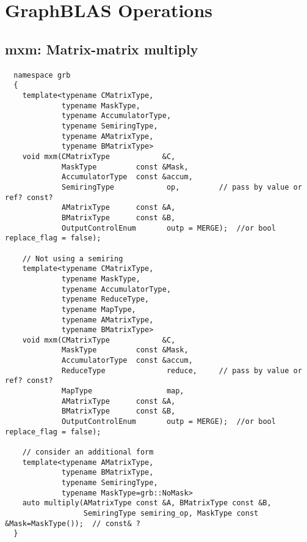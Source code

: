 \pagebreak
\section{GraphBLAS Operations}

\subsection{{\sf mxm}: Matrix-matrix multiply}

\paragraph{\syntax}

\begin{verbatim}
  namespace grb 
  {
    template<typename CMatrixType,
             typename MaskType,
             typename AccumulatorType,
             typename SemiringType,
             typename AMatrixType,
             typename BMatrixType>
    void mxm(CMatrixType            &C,
             MaskType         const &Mask,
             AccumulatorType  const &accum,
             SemiringType            op,         // pass by value or ref? const?
             AMatrixType      const &A,
             BMatrixType      const &B,
             OutputControlEnum       outp = MERGE);  //or bool replace_flag = false);

    // Not using a semiring
    template<typename CMatrixType,
             typename MaskType,
             typename AccumulatorType,
             typename ReduceType,
             typename MapType,
             typename AMatrixType,
             typename BMatrixType>
    void mxm(CMatrixType            &C,
             MaskType         const &Mask,
             AccumulatorType  const &accum,
             ReduceType              reduce,     // pass by value or ref? const?
             MapType                 map,
             AMatrixType      const &A,
             BMatrixType      const &B,
             OutputControlEnum       outp = MERGE);  //or bool replace_flag = false);

    // consider an additional form
    template<typename AMatrixType,
             typename BMatrixType,
             typename SemiringType,
             typename MaskType=grb::NoMask>
    auto multiply(AMatrixType const &A, BMatrixType const &B,
                  SemiringType semiring_op, MaskType const &Mask=MaskType());  // const& ?
  }
\end{verbatim}


